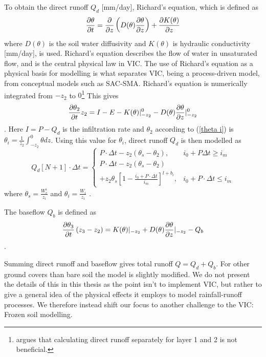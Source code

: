 To obtain the direct runoff $Q_d$ [mm/day], Richard's equation, which is defined as 
\begin{equation}
    \pdv{\theta}{t} = \pdv{}{z}\left( D(\theta)\pdv{\theta}{z}  \right) + \pdv{K(\theta)}{z}
    \label{richard}
\end{equation}
where $D(\theta)$ is the soil water diffusivity and $K(\theta)$ is hydraulic
conductivity [mm/day], is used. Richard's equation describes the flow of water 
in unsaturated flow, and is the central physical law in VIC. The use of Richard's 
equation as a physical basis for modelling is what separates VIC, being a process-driven 
model, from conceptual models such as SAC-SMA.
Richard's equation is numerically integrated from $-z_{2}$ to $0$\footnote{\citet{VIC2L} argues that 
calculating direct runoff separately for layer 1 and 2 is not beneficial.}
This gives
\begin{equation}
    \pdv{\theta_2}{t}z_2 = I - E - K(\theta) |_{-z_2}^0 - D(\theta) \pdv{\theta}{z} |_{-z_2}^0
    \label{richards numerical}
\end{equation}
\citep{VIC2L}.
Here $I = P - Q_d$ is the infiltration rate and $\theta_2$ according to (\ref{theta i}) 
is $\theta_i = \frac{1}{z_2}\int_{-z_2}^0 \theta dz$.
Using this value for $\theta_i$, direct runoff $Q_d$ is then modelled as 
\begin{equation}
Q_d\left[ N+1 \right] \cdot \Delta t = 
\begin{cases}
    P \cdot \Delta t - z_2 (\theta_s - \theta_2), &  i_0 + P \Delta t \geq i_m\\
    P \cdot \Delta t - z_2 (\theta_s - \theta_2) \\ + z_2 \theta_s \left[  1 - 
    \frac{i_0 + P \cdot \Delta t}{i_m} \right]^{l+b_i}, & i_0 + P \cdot \Delta t \leq i_m
\end{cases} \label{VIC direct runoff}
\end{equation}
where $\theta_s=\frac{W_c^i}{z_i}$ and $\theta_i = \frac{W_i}{z_i}$ \citep{VIC2L}.

The baseflow $Q_b$ is defined as 
\begin{equation}
    \pdv{\theta_3}{t} \left(z_3 - z_2\right) = K(\theta)|_{-z_2} + D(\theta)
    \pdv{\theta}{z}|_{-z_2} - Q_b \label{Qb}
\end{equation}
\citep{VIC2L}.

Summing direct runoff and baseflow gives total runoff $Q=Q_d + Q_b$. For other ground covers 
than bare soil the model is slightly modified. We do not present the details of 
this in this thesis as the point isn't to implement VIC, but rather to give a general 
idea of the physical effects it employs to model rainfall-runoff processes. We therefore 
instead shift our focus to another challenge to the VIC: Frozen soil modelling.

